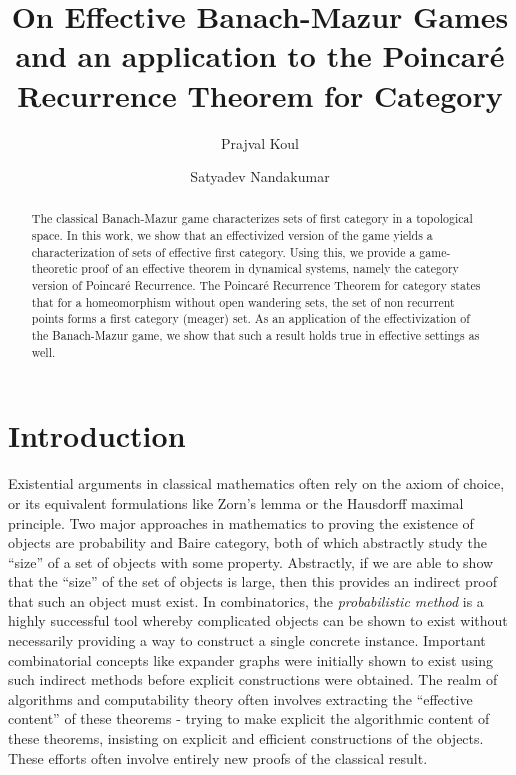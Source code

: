 \documentclass[a4paper,UKenglish,autoref,thm-restate,numberwithinsect]{lipics-v2021}
\title{On Effective Banach-Mazur Games and an application to the Poincar\'e Recurrence Theorem for Category}
\author{Prajval Koul}{Department of Computer Science and Engineering, Indian Institute of Technology Kanpur, India. \and \url{https://prajvalkoul.github.io/}}{prajvalk21@iitk.ac.in}{https://orcid.org/0000-0002-8879-8330}{}
\author{Satyadev Nandakumar}{Department of Computer Science and Engineering, Indian Institute of Technology Kanpur, Kanpur, Uttar Pradesh, India. \and \url{https://www.cse.iitk.ac.in/users/satyadev/} }{satyadev@cse.iitk.ac.in}{https://orcid.org/0000-0002-0214-0598}{}
\begin{document}
\maketitle

\begin{abstract}
  The classical Banach-Mazur game characterizes sets of first category
  in a topological space. In this work, we show that an effectivized
  version of the game yields a characterization of sets of effective
  first category. Using this, we provide a game-theoretic proof of an
  effective theorem in dynamical systems, namely the category version
  of Poincar\'{e} Recurrence. The Poincar\'e Recurrence Theorem for
  category states that for a homeomorphism without open wandering
  sets, the set of non recurrent points forms a first category
  (meager) set. As an application of the effectivization of the
  Banach-Mazur game, we show that such a result holds true in
  effective settings as well.
\end{abstract}



\section{Introduction}
Existential arguments in classical mathematics often rely on the axiom
of choice, or its equivalent formulations like Zorn's lemma or the
Hausdorff maximal principle. Two major approaches in mathematics to
proving the existence of objects are probability and Baire category,
both of which abstractly study the ``size'' of a set of objects with
some property. Abstractly, if we are able to show that the ``size'' of
the set of objects is large, then this provides an indirect proof that
such an object must exist. In combinatorics, the \emph{probabilistic
  method} is a highly successful tool whereby complicated objects can
be shown to exist without necessarily providing a way to construct a
single concrete instance. Important combinatorial concepts like
expander graphs were initially shown to exist using such indirect
methods \cite{Pinsker1973} before explicit constructions were
obtained. The realm of algorithms and computability theory often
involves extracting the ``effective content'' of these theorems -
trying to make explicit the algorithmic content of these theorems,
insisting on explicit and efficient constructions of the objects.
These efforts often involve entirely new proofs of the classical
result.
\end{document}
